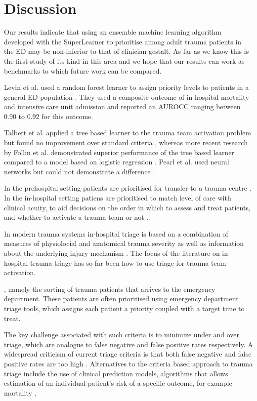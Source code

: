 \documentclass[10pt,letterpaper]{article}\usepackage[]{graphicx}\usepackage[]{color}
\begin{document}
\section*{Discussion}
Our results indicate that using an ensemble machine learning algorithm developed
with the SuperLearner to prioritise among adult trauma patients in the ED may be
non-inferior to that of clinician gestalt. As far as we know this is the first
study of its kind in this area and we hope that our results can work as
benchmarks to which future work can be compared. 

Levin et al. used a random forest learner to assign priority levels to patients
in a general ED population \cite{Levin2018}. They used a composite outcome of
in-hospital mortality and intensive care unit admission and reported an AUROCC
ranging between 0.90 to 0.92 for this outcome. 

Talbert et al. applied a tree based learner to the trauma team activation
problem but found no improvement over standard criteria \cite{Talbert2007},
whereas more recent research by Follin et al. demonstrated superior performance
of the tree based learner compared to a model based on logistic regression
\cite{Follin2016}. Pearl et al. used neural networks but could not demonstrate a
difference \cite{Pearl2008}.

In the prehospital setting patients are prioritised for transfer to a trauma
centre \cite{Voskens2018}. In the in-hospital setting patiens are prioritised to
match level of care with clinical acuity, to aid decisions on the order in which
to assess and treat patients, and whether to activate a trauma team or not
\cite{Granstrom2018}.

In modern trauma systems in-hospital triage is based on a combination of
measures of physiolocial and anatomical trauma severity as well as information
about the underlying injury mechanism \cite{ASCOT2014}. The focus of the
literature on in-hospital trauma triage has so far been how to use triage for
trauma team activation.

, namely the sorting of trauma patients that arrives to the emergency
department. These patients are often prioritised using emergency department
triage tools, which assigns each patient a priority coupled with a target time
to treat.

The key challenge associated with such criteria is to minimize under and over
triage, which are analogue to false negative and false positive rates
respectively. A widespread criticism of current triage criteria is that both
false negative and false positive rates are too high
\cite{VanRein2018,Benjamin2018,Kristiansen2010}.  Alternatives to the criteria
based approach to trauma triage include the use of clinical prediction models,
algorithms that allows estimation of an individual patient's risk of a specific
outcome, for example mortality \cite{Collins2015}.
\end{document}
